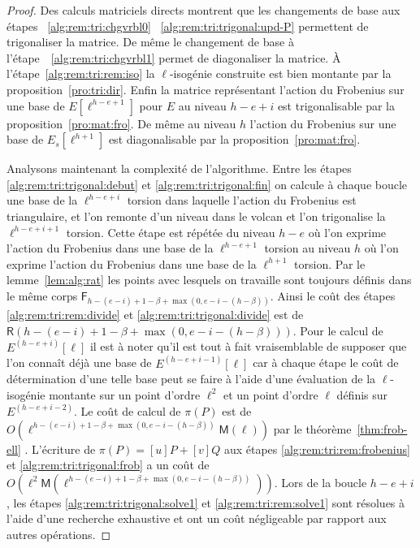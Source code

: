 \documentclass[10pt,a4paper]{book}
\theoremstyle{plain}
\theoremstyle{definition}
\theoremstyle{definition}
\theoremstyle{definition}
\theoremstyle{definition}
\theoremstyle{remark}
\theoremstyle{remark}
\theoremstyle{definition}
\begin{document}
\begin{proof}
Des calculs matriciels directs montrent que les changements de base aux étapes
 ~\ref{alg:rem:tri:chgvrbl0} ~\ref{alg:rem:tri:trigonal:upd-P} permettent de 
trigonaliser la matrice. De même le changement de base à 
l'étape~~\ref{alg:rem:tri:chgvrbl1} permet de diagonaliser la matrice.
\`A l'étape~\ref{alg:rem:tri:rem:iso} la $\ell$-isogénie construite est bien 
montante par la proposition~\ref{pro:tri:dir}. Enfin la matrice représentant
l'action du Frobenius sur une base de $E[\ell^{h-e+1}]$ pour $E$ au niveau 
$h-e+i$ est trigonalisable par la proposition~\ref{pro:mat:fro}. De même au 
niveau $h$ l'action du Frobenius sur une base de $E_s[\ell^{h+1}]$ est 
diagonalisable par la proposition~\ref{pro:mat:fro}.
 
Analysons maintenant la complexité de l'algorithme. 
Entre les étapes \ref{alg:rem:tri:trigonal:debut} et \ref{alg:rem:tri:trigonal:fin}
on calcule à chaque boucle une base de la $\ell^{h-e+i}$ torsion dans laquelle 
l'action du Frobenius est triangulaire, et l'on remonte d'un niveau dans le 
volcan et l'on trigonalise la $\ell^{h-e+i+1}$ torsion. Cette étape est répétée du niveau $h-e$ où l'on exprime
l'action du Frobenius dans une base de la $\ell^{h-e+1}$ torsion au niveau $h$ 
où l'on exprime l'action du Frobenius dans une base de la $\ell^{h+1}$ torsion.
Par le lemme~\ref{lem:alg:rat} les points avec lesquels on travaille sont 
toujours définis dans le même corps $\mathsf{F}_{h-(e-i)+1-\beta+\max(0,e-i-
(h-\beta))}$. Ainsi le coût des étapes \ref{alg:rem:tri:rem:divide} et 
\ref{alg:rem:tri:trigonal:divide} est de $\mathsf{R}(h-(e-i)+1-\beta+\max(0,e-i
-(h-\beta)))$.  Pour le calcul de $E^{(h-e+i)}[\ell]$ il est à noter qu'il est 
tout à fait vraisemblable de supposer que l'on connaît déjà une base de 
$E^{(h-e+i-1)}[\ell]$ car à chaque étape le coût de détermination d'une telle 
base peut se faire à l'aide d'une évaluation de la $\ell$-isogénie montante sur
un point d'ordre $\ell^2$ et un point d'ordre $\ell$ définis sur 
 $E^{(h-e+i-2)}$. Le coût de calcul de $\pi(P)$ est de $O(\ell^{h-(e-i)+1
-\beta +\max(0,e-i-(h-\beta))}\mathsf{M}(\ell))$ par le 
théorème~\ref{thm:frob-ell} . L'écriture de $\pi(P)=[u]P+[v]Q$ 
aux étapes \ref{alg:rem:tri:rem:frobenius} et \ref{alg:rem:tri:trigonal:frob} a
un coût de $O(\ell^2 \mathsf{M}(\ell^{h-(e-i)+1-\beta+\max(0,e-i-(h-\beta))}))$. 
Lors de la boucle $h-e+i$, les étapes \ref{alg:rem:tri:trigonal:solve1} et 
\ref{alg:rem:tri:rem:solve1} sont résolues à l'aide d'une recherche exhaustive 
et ont un coût négligeable par rapport aux autres opérations. 



\end{proof}
\end{document}
